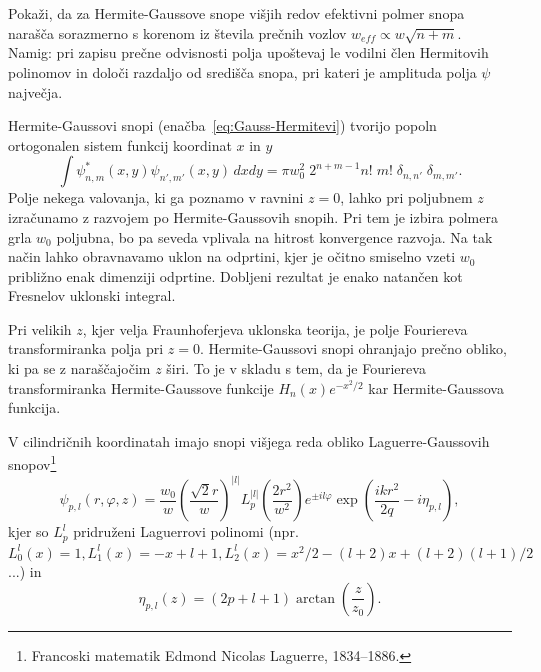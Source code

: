 \begin{definition}
\label{naloga:HG}
Pokaži, da za Hermite-Gaussove snope višjih redov efektivni polmer snopa 
narašča sorazmerno s korenom iz števila prečnih vozlov $ w_{eff}\propto w\sqrt{n+m}$.\\
Namig: pri zapisu prečne odvisnosti polja upoštevaj le vodilni člen
 Hermitovih polinomov in določi razdaljo od središča snopa, pri kateri je 
 amplituda polja $\psi$ največja.
\end{definition}

\begin{remark}
 Hermite-Gaussovi snopi (enačba~\ref{eq:Gauss-Hermitevi}) tvorijo popoln
ortogonalen sistem funkcij koordinat $x$ in $y$
\begin{equation}
\int\psi_{n,m}^{*}(x,y)\psi_{n',m'}(x,y)\, dx dy=\pi w_{0}^{2}\; 
2^{n+m-1}n!\;m!\; \delta_{n,n'}\;\delta_{m,m'}.
\end{equation}
Polje nekega valovanja, ki ga poznamo v ravnini $z=0$, lahko pri
poljubnem $z$ izračunamo z razvojem po Hermite-Gaussovih snopih. Pri tem
je izbira polmera grla $w_{0}$ poljubna, bo pa seveda vplivala na
hitrost konvergence razvoja. Na tak način lahko obravnavamo uklon
na odprtini, kjer je očitno smiselno vzeti $w_{0}$ približno enak
dimenziji odprtine. Dobljeni rezultat je enako natančen kot Fresnelov
uklonski integral.

Pri velikih $z$, kjer velja Fraunhoferjeva uklonska teorija, je
polje Fouriereva transformiranka polja pri $z=0$. Hermite-Gaussovi
snopi ohranjajo prečno obliko, ki pa se z naraščajočim $z$ širi. 
To je v skladu s tem, da je Fouriereva transformiranka Hermite-Gaussove funkcije 
$H_{n}(x)e^{-x^{2}/2}$ kar Hermite-Gaussova funkcija.
\end{remark}

V cilindričnih koordinatah imajo snopi višjega reda obliko Laguerre-Gaussovih 
snopov\footnote{Francoski matematik Edmond Nicolas Laguerre, 1834--1886.}
\begin{equation}
\psi_{p,l}(r,\varphi,z)=\frac{w_{0}}{w}\left(\frac{\sqrt{2}r}{w}\right)^{|l|}
L_{p}^{|l|}\left(\frac{2r^{2}}{w^{2}}\right)e^{\pm il\varphi}\exp\left(\frac{ikr^{2}}{2q}-i\eta_{p,l}\right),
\label{eq:Gauss-Laguerrevi}
\end{equation}
kjer so $L_{p}^{l}$ pridruženi Laguerrovi polinomi (npr. 
$L_{0}^{l}(x) = 1, 
L_{1}^{l}(x) = -x+l+1, 
L_{2}^{l}(x) = x^2/2-(l+2)x+(l+2)(l+1)/2
$ ...) in 
\begin{equation}
\eta_{p,l}\left(z\right)=(2p+l+1)\arctan\left(\frac{z}{z_{0}}\right).
\label{eq:etaGL}
\end{equation}

